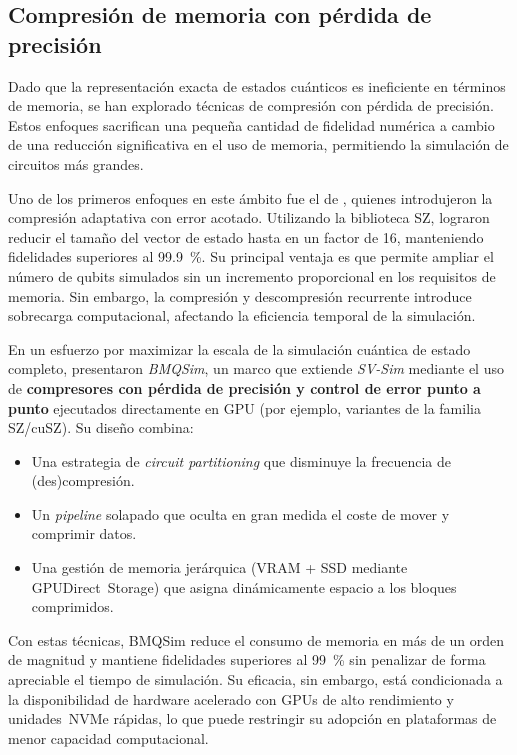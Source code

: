 \subsection{\normalsize Compresión de memoria con pérdida de precisión}
Dado que la representación exacta de estados cuánticos es ineficiente en términos
de memoria, se han explorado técnicas de compresión con pérdida de precisión. Estos
enfoques sacrifican una pequeña cantidad de fidelidad numérica a cambio de una
reducción significativa en el uso de memoria, permitiendo la simulación de
circuitos más grandes.

Uno de los primeros enfoques en este ámbito fue el de \textcite{wu2018amplitude, wu2019full},
quienes introdujeron la compresión adaptativa con error acotado. Utilizando la
biblioteca SZ, lograron reducir el tamaño del vector de estado hasta en un factor
de 16, manteniendo fidelidades superiores al 99.9~\%. Su principal ventaja es
que permite ampliar el número de qubits simulados sin un incremento
proporcional en los requisitos de memoria. Sin embargo, la compresión y
descompresión recurrente introduce sobrecarga computacional, afectando la eficiencia
temporal de la simulación.

En un esfuerzo por maximizar la escala de la simulación cuántica de estado
completo, \textcite{zhang2024bmqsim} presentaron \emph{BMQSim}, un marco que
extiende \emph{SV-Sim} mediante el uso de \textbf{compresores con pérdida de
precisión y control de error punto a punto} ejecutados directamente en GPU (por
ejemplo, variantes de la familia SZ/cuSZ)\cite{zhang2024bmqsim}. Su diseño
combina:
\begin{itemize}
    \item Una estrategia de \textit{circuit partitioning} que disminuye la
        frecuencia de (des)compresión.

    \item Un \textit{pipeline} solapado que oculta en gran medida el coste de
        mover y comprimir datos.

    \item Una gestión de memoria jerárquica (VRAM + SSD mediante GPUDirect~Storage)
        que asigna dinámicamente espacio a los bloques comprimidos.
\end{itemize}
Con estas técnicas, BMQSim reduce el consumo de memoria en más de un orden de magnitud
y mantiene fidelidades superiores al 99~\% sin penalizar de forma apreciable el
tiempo de simulación. Su eficacia, sin embargo, está condicionada a la
disponibilidad de hardware acelerado con GPUs de alto rendimiento y
unidades NVMe rápidas, lo que puede restringir su adopción en plataformas de menor
capacidad computacional.

